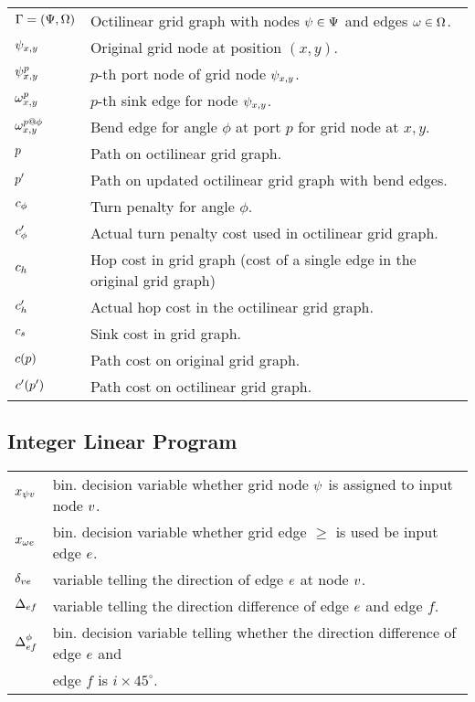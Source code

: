 \documentclass{article}
\makeatletter
\newenvironment{eqdesc}
  {\par\vspace{\abovedisplayskip}\noindent\begin{tabular}{>{$}l<{$} @{${}\hspace{0.6cm}{}$} l}}
  {\end{tabular}\par\vspace{\belowdisplayskip}}
\makeatother
\begin{document}
\begin{eqdesc}
	\gG  = (\gV, \gE)     &  Octilinear grid graph with nodes $\psi \in \Psi$ and edges $\omega \in \Omega$.\\
	\ggv{x}{y} & Original grid node at position $(x, y)$. \\
	\gpv{x}{y}{p}  & $p$-th port node of grid node $\psi_{x, y}$. \\
	\gse{x}{y}{p}  & $p$-th sink edge for node $\psi_{x, y}$. \\
	\gbe{x}{y}{p}{\phi}  & Bend edge for angle $\phi$ at port $p$ for grid node at $x, y$. \\
	\gPath      	 & Path on octilinear grid graph. \\
	\gPathOcti      & Path on updated octilinear grid graph with bend edges. \\
	\gPturn{\phi}  & Turn penalty for angle $\phi$. \\
	\gPturnEdge{\phi}  & Actual turn penalty cost used in octilinear grid graph. \\
	\gHopcost    & Hop cost in grid graph (cost of a single edge in the original grid graph) \\
	\gHopcostOcti &   Actual hop cost in the octilinear grid graph. \\
	\gSinkcost & Sink cost in grid graph. \\
	\gPcost{\gPath}  & Path cost on original grid graph. \\
	\gPcostOcti{\gPathOcti}  & Path cost on octilinear grid graph.

\end{eqdesc}

\subsection{Integer Linear Program}

\begin{eqdesc}

\gvused{\gv}{\iv} & bin. decision variable whether grid node $\psi$ is assigned to input node $v$.\\
\geused{\ge}{\ie} & bin. decision variable whether grid edge $\ge$ is used be input edge $e$.\\
\dir{\iv}{\ie} & variable telling the direction of edge $e$ at node $v$.\\
\dirdiff{\ie}{f}	& variable telling the direction difference of edge $e$ and edge $f$.\\
\bend{\ie}{f}{\phi} & bin. decision  variable telling whether the direction difference of edge $e$ and\\
                    & edge $f$ is $i \times 45^{\circ}$.

\end{eqdesc}
\end{document}
